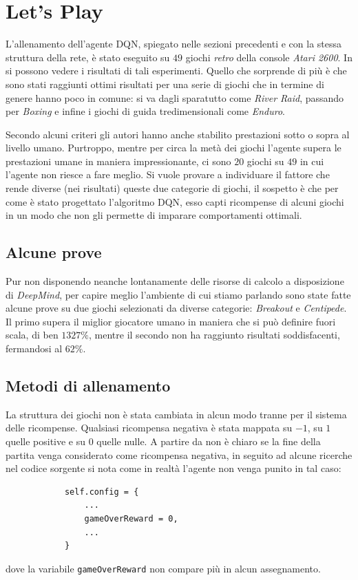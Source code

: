 \documentclass[twoside,twocolumn,10pt]{extarticle}
\theoremstyle{definition}
\begin{document}
\section{Let's Play}\label{}
	L'allenamento dell'agente DQN, spiegato nelle sezioni precedenti e con la stessa struttura della rete, è stato eseguito su $49$ giochi \textit{retro} della console \textit{Atari 2600}. In \cite{bib:dqn} si possono vedere i risultati di tali esperimenti. Quello che sorprende di più è che sono stati raggiunti ottimi risultati per una serie di giochi che in termine di genere hanno poco in comune: si va dagli sparatutto come \textit{River Raid}, passando per \textit{Boxing} e infine i giochi di guida tredimensionali come \textit{Enduro}.
	
	Secondo alcuni criteri gli autori hanno anche stabilito prestazioni sotto o sopra al livello umano. Purtroppo, mentre per circa la metà dei giochi l'agente supera le prestazioni umane in maniera impressionante, ci sono $20$ giochi su $49$ in cui l'agente non riesce a fare meglio. Si vuole provare a individuare il fattore che rende diverse (nei risultati) queste due categorie di giochi, il sospetto è che per come è stato progettato l'algoritmo DQN, esso capti ricompense di alcuni giochi in un modo che non gli permette di imparare comportamenti ottimali.
	
	\subsection{Alcune prove}
		Pur non disponendo neanche lontanamente delle risorse di calcolo a disposizione di \textit{DeepMind}, per capire meglio l'ambiente di cui stiamo parlando sono state fatte alcune prove su due giochi selezionati da diverse categorie: \textit{Breakout} e \textit{Centipede}. Il primo supera il miglior giocatore umano in maniera che si può definire fuori scala, di ben $1327\%$, mentre il secondo non ha raggiunto risultati soddisfacenti, fermandosi al $62\%$.

	\subsection{Metodi di allenamento}
		La struttura dei giochi non è stata cambiata in alcun modo tranne per il sistema delle ricompense. Qualsiasi ricompensa negativa è stata mappata su $-1$, su $1$ quelle positive e su $0$ quelle nulle. A partire da \cite{bib:dqn} non è chiaro se la fine della partita venga considerato come ricompensa negativa, in seguito ad alcune ricerche nel codice sorgente si nota come in realtà l'agente non venga punito in tal caso:
		\begin{verbatim}
			self.config = {
				...
				gameOverReward = 0,
				...
			}
		\end{verbatim}
		dove la variabile \texttt{gameOverReward} non compare più in alcun assegnamento.
		
\end{document}
